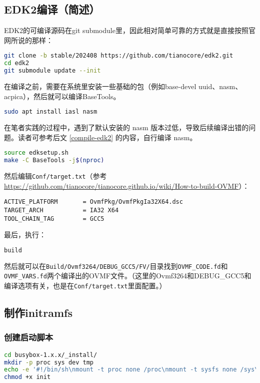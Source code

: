\subsection{EDK2编译（简述）}

EDK2的可编译源码在git submodule里，因此相对简单可靠的方式就是直接按照官网所说的那样：
\begin{lstlisting}[language=bash]
git clone -b stable/202408 https://github.com/tianocore/edk2.git
cd edk2
git submodule update --init
\end{lstlisting}

在编译之前，需要在系统里安装一些基础的包（例如base-devel uuid、nasm、acpica），然后就可以编译BaseTools。

\begin{lstlisting}[language=bash]
    sudo apt install iasl nasm
\end{lstlisting}

在笔者实践的过程中，遇到了默认安装的 nasm 版本过低，导致后续编译出错的问题。读者可参考后文 \ref{compile-edk2} 的内容，自行编译 nasm。

\begin{lstlisting}[language=bash]
source edksetup.sh
make -C BaseTools -j$(nproc)
\end{lstlisting}
然后编辑\texttt{Conf/target.txt}（参考\url{https://github.com/tianocore/tianocore.github.io/wiki/How-to-build-OVMF}）：
\begin{lstlisting}
ACTIVE_PLATFORM       = OvmfPkg/OvmfPkgIa32X64.dsc
TARGET_ARCH           = IA32 X64
TOOL_CHAIN_TAG        = GCC5
\end{lstlisting}
最后，执行：
\begin{lstlisting}[language=bash]
build
\end{lstlisting}
然后就可以在\texttt{Build/Ovmf3264/DEBUG\_GCC5/FV/}目录找到\texttt{OVMF\_CODE.fd}和\texttt{OVMF\_VARS.fd}两个编译出的OVMF文件。（这里的Ovmf3264和DEBUG\_GCC5和编译选项有关，也是在\texttt{Conf/target.txt}里面配置。）

\subsection{制作initramfs}
\subsubsection{创建启动脚本}
\begin{lstlisting}[language=bash, language=bash, showstringspaces=false]
cd busybox-1.x.x/_install/
mkdir -p proc sys dev tmp
echo -e '#!/bin/sh\nmount -t proc none /proc\nmount -t sysfs none /sys\nmount -t tmpfs none /tmp\nmount -t devtmpfs none /dev\necho "Hello Linux!"\nexec /bin/sh' > init
chmod +x init
\end{lstlisting}

